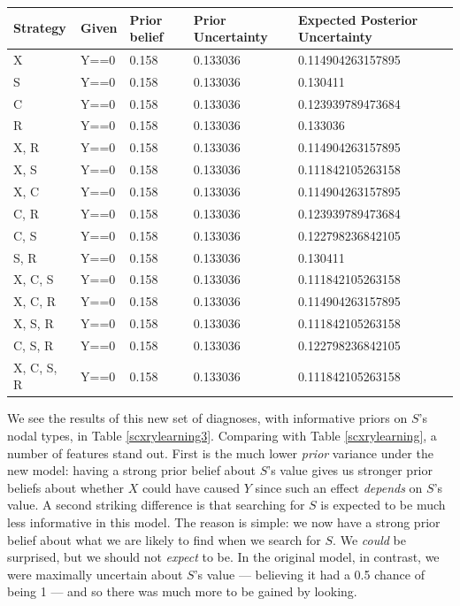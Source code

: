 \documentclass[12pt,]{book}
\begin{document}
\begin{tabular}{l|l|l|l|l}
\hline
Strategy & Given & Prior belief & Prior Uncertainty & Expected Posterior Uncertainty\\
\hline
X & Y==0 & 0.158 & 0.133036 & 0.114904263157895\\
\hline
S & Y==0 & 0.158 & 0.133036 & 0.130411\\
\hline
C & Y==0 & 0.158 & 0.133036 & 0.123939789473684\\
\hline
R & Y==0 & 0.158 & 0.133036 & 0.133036\\
\hline
X, R & Y==0 & 0.158 & 0.133036 & 0.114904263157895\\
\hline
X, S & Y==0 & 0.158 & 0.133036 & 0.111842105263158\\
\hline
X, C & Y==0 & 0.158 & 0.133036 & 0.114904263157895\\
\hline
C, R & Y==0 & 0.158 & 0.133036 & 0.123939789473684\\
\hline
C, S & Y==0 & 0.158 & 0.133036 & 0.122798236842105\\
\hline
S, R & Y==0 & 0.158 & 0.133036 & 0.130411\\
\hline
X, C, S & Y==0 & 0.158 & 0.133036 & 0.111842105263158\\
\hline
X, C, R & Y==0 & 0.158 & 0.133036 & 0.114904263157895\\
\hline
X, S, R & Y==0 & 0.158 & 0.133036 & 0.111842105263158\\
\hline
C, S, R & Y==0 & 0.158 & 0.133036 & 0.122798236842105\\
\hline
X, C, S, R & Y==0 & 0.158 & 0.133036 & 0.111842105263158\\
\hline
\end{tabular}

We see the results of this new set of diagnoses, with informative priors on \(S\)'s nodal types, in Table \ref{scxrylearning3}. Comparing with Table \ref{scxrylearning}, a number of features stand out. First is the much lower \emph{prior} variance under the new model: having a strong prior belief about \(S\)'s value gives us stronger prior beliefs about whether \(X\) could have caused \(Y\) since such an effect \emph{depends} on \(S\)'s value. A second striking difference is that searching for \(S\) is expected to be much less informative in this model. The reason is simple: we now have a strong prior belief about what we are likely to find when we search for \(S\). We \emph{could} be surprised, but we should not \emph{expect} to be. In the original model, in contrast, we were maximally uncertain about \(S\)'s value --- believing it had a 0.5 chance of being 1 --- and so there was much more to be gained by looking.
\end{document}
